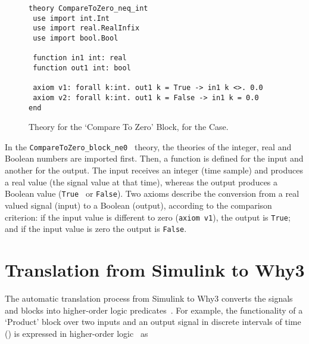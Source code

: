 \documentclass[a4paper]{article}
\begin{document}
\begin{figure}[!t]
\centering
\begin{verbatim}
theory CompareToZero_neq_int
 use import int.Int  
 use import real.RealInfix
 use import bool.Bool
 
 function in1 int: real
 function out1 int: bool
 
 axiom v1: forall k:int. out1 k = True -> in1 k <>. 0.0
 axiom v2: forall k:int. out1 k = False -> in1 k = 0.0 
end
\end{verbatim}
\caption{Theory for the `Compare To Zero' Block, for the  Case.}
\label{theory2}
\end{figure}

In the \verb+CompareToZero_block_ne0 + theory, the theories of the integer, real and Boolean numbers are imported first. Then, a function is defined for the input and another for the output. The input receives an integer (time sample) and produces a real value (the signal value at that time), whereas the output produces a Boolean value (\verb+True + or \verb+False+). Two axioms describe the conversion from a real valued signal (input) to a Boolean (output), according to the comparison criterion: if the input value is different to zero (\verb+axiom v1+), the output is \verb+True+; and if the input value is zero the output is \verb+False+. 

\section{Translation from Simulink to Why3} \label{translation}

The automatic translation process from Simulink to Why3 converts the signals and blocks into higher-order logic predicates~\cite{Hardware}. For example, the functionality of a `Product' block over two inputs and an output signal in discrete intervals of time () is expressed in higher-order logic~\cite{Hardware} as
\end{document}
